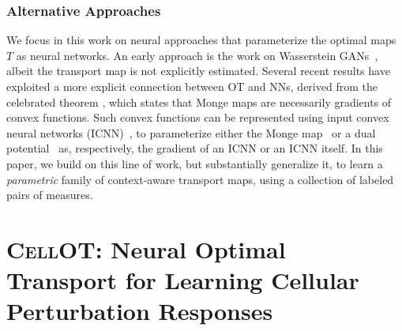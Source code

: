 \subsubsection{Alternative Approaches}  We focus in this work on neural approaches that parameterize the optimal maps $T$ as neural networks. An early approach is the work on Wasserstein GANs~\citep{arjovsky2017wasserstein}, albeit the transport map is not explicitly estimated. 
Several recent results have exploited a more explicit connection between OT and NNs, derived from the celebrated \citeauthor{Brenier1987} theorem \citeyearpar{Brenier1987}, which states that Monge maps are necessarily gradients of convex functions.
Such convex functions can be represented using input convex neural networks (ICNN)~\citep{amos2017input}, to parameterize either the Monge map~\citep{korotin2021wasserstein,yang2018scalable,bunne2021learning,bunne2022proximal} or a dual potential~\citep{makkuva2020optimal,korotin2021wasserstein} as, respectively, the gradient of an ICNN or an ICNN itself.
In this paper, we build on this line of work, but substantially generalize it, to learn a {\em parametric} family of context-aware transport maps, using a collection of labeled pairs of measures.


\section[\textsc{CellOT}: Neural OT for Learning Cell Perturbation Responses]{\textsc{CellOT}: Neural Optimal Transport for Learning Cellular Perturbation Responses}

